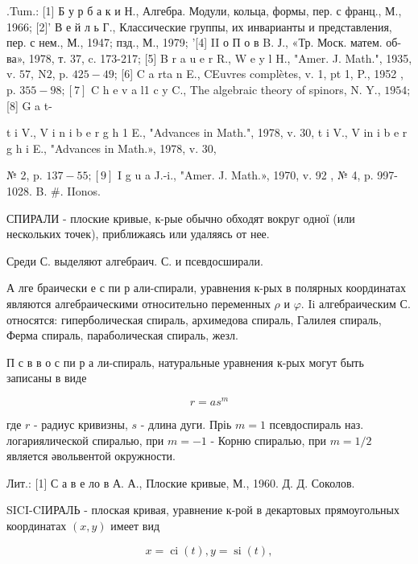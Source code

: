 \documentclass[10pt]{article}
\begin{document}
.Tum.: [1] Б у р б а к и Н., Алгебра. Модули, кольца, формы, пер. с франц., М., 1966; [2]' В е й л ь Г., Классические группы, их инварианты и представления, пер. с нем., М., 1947; пзд., М., 1979; '[4] II о П о в B. Ј., «Тр. Моск. матем. об-ва», 1978, т. 37, c. 173-217; [5] B r a u e r R., W e y l H., "Amer. J. Math.", 1935, v. $57, \mathrm{~N} 2$, p. $425-49$; [6] C a rta n E., CEuvres complètes, v. 1, pt 1, P., 1952 , p. $355-98 ;[7]$ C h e v a l1 c y C., The algebraic theory of spinors, N. Y., $1954 ;$ [8] G a t-

t i V., V i n i b e r g h 1 E., "Advances in Math.", 1978, v. 30, t i V., V in i b e r g h i E., "Advances in Math.», 1978, v. 30,

№ 2, p. $137-55 ;[9]$ I g u a J.-i., "Amer. J. Math.», 1970, v. 92 , № 4, p. 997-1028. B. \#. IIonos.



СПИРАЛИ - плоские кривые, к-рые обычно обходят вокруг одної (или нескольких точек), приближаясь или удаляясь от нее.



Среди С. выделяют алгебраич. С. и псевдосширали.



А лге браически е с пи р али-спирали, уравнения к-рых в полярных координатах являются алгебраическими относительно переменных $\rho$ и $\varphi$. Ii алгебраическим С. относятся: гиперболическая спираль, архимедова спираль, Галилея спираль, Ферма спираль, параболическая спираль, жезл.



П с в в о с пи р а ли-спираль, натуральные уравнения к-рых могут быть записаны в виде



\[

r=a s^{m}

\]



где $r$ - радиус кривизны, $s$ - длина дуги. Пріь $m=1$ псевдоспираль наз. логариялической спиралью, при $m=-1$ - Корню спиралью, при $m=1 / 2$ является әвольвентой окружности.



Лит.: [1] С а в е ло в А. А., Плоские кривые, М., 1960. Д. Д. Соколов.



SICI-CIИРАЛЬ - плоская кривая, уравнение к-рой в декартовых прямоугольных координатах $(x, y)$ имеет вид



\[

x=\operatorname{ci}(t), y=\operatorname{si}(t),

\]
\end{document}
